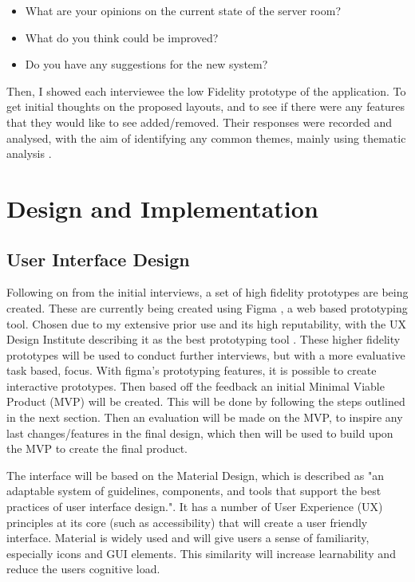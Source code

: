 \documentclass [11pt,letterpaper]{article}
\begin{document}
\begin{itemize}
    \item What are your opinions on the current state of the server room?
    \item What do you think could be improved?
    \item Do you have any suggestions for the new system?
\end{itemize}

Then, I showed each interviewee the low Fidelity prototype of the application. To get initial thoughts on the  proposed layouts, and to see if there were any features that they would like to see added/removed. Their responses were recorded and analysed, with the aim of identifying any common themes, mainly using thematic analysis \cite{thematicAnal}.

\section{Design and Implementation}
\label{sec:design}
\subsection{User Interface Design}
\label{sec:ui_design}
Following on from the initial interviews, a set of high fidelity prototypes are being created. These are currently being created using Figma \cite{figma}, a web based prototyping tool. Chosen due to my extensive prior use and its high reputability, with the UX Design Institute describing it as the best prototyping tool \cite{figmaUX}. These higher fidelity prototypes will be used to conduct further interviews, but with a more evaluative task based, focus. With figma's prototyping features, it is possible to create interactive prototypes. Then based off the feedback an initial Minimal Viable Product (MVP) will be created. This will be done by following the steps outlined in the next section. Then an evaluation will be made on the MVP, to inspire any last changes/features in the final design, which then will be used to build upon the MVP to create the final product.

The interface will be based on the Material Design, which is described as "an adaptable system of guidelines, components, and tools that support the best practices of user interface design."\cite{materialDesign}. It has a number of User Experience (UX) principles at its core (such as accessibility) that will create a user friendly interface. Material is widely used and will give users a sense of familiarity, especially icons and GUI elements. This similarity will increase learnability and reduce the users cognitive load.
\end{document}
